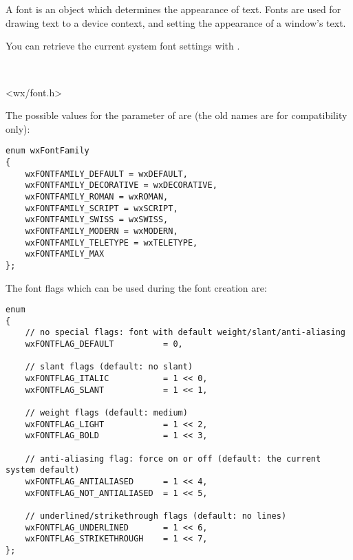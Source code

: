 \section{}\label{wxfont}

A font is an object which determines the appearance of text. Fonts are
used for drawing text to a device context, and setting the appearance of
a window's text.

You can retrieve the current system font settings with .



\\


<wx/font.h>


The possible values for the  parameter of  are (the old names are for compatibility only):

\begin{verbatim}
enum wxFontFamily
{
    wxFONTFAMILY_DEFAULT = wxDEFAULT,
    wxFONTFAMILY_DECORATIVE = wxDECORATIVE,
    wxFONTFAMILY_ROMAN = wxROMAN,
    wxFONTFAMILY_SCRIPT = wxSCRIPT,
    wxFONTFAMILY_SWISS = wxSWISS,
    wxFONTFAMILY_MODERN = wxMODERN,
    wxFONTFAMILY_TELETYPE = wxTELETYPE,
    wxFONTFAMILY_MAX
};
\end{verbatim}

The font flags which can be used during the font creation are:

\begin{verbatim}
enum
{
    // no special flags: font with default weight/slant/anti-aliasing
    wxFONTFLAG_DEFAULT          = 0,

    // slant flags (default: no slant)
    wxFONTFLAG_ITALIC           = 1 << 0,
    wxFONTFLAG_SLANT            = 1 << 1,

    // weight flags (default: medium)
    wxFONTFLAG_LIGHT            = 1 << 2,
    wxFONTFLAG_BOLD             = 1 << 3,

    // anti-aliasing flag: force on or off (default: the current system default)
    wxFONTFLAG_ANTIALIASED      = 1 << 4,
    wxFONTFLAG_NOT_ANTIALIASED  = 1 << 5,

    // underlined/strikethrough flags (default: no lines)
    wxFONTFLAG_UNDERLINED       = 1 << 6,
    wxFONTFLAG_STRIKETHROUGH    = 1 << 7,
};
\end{verbatim}

